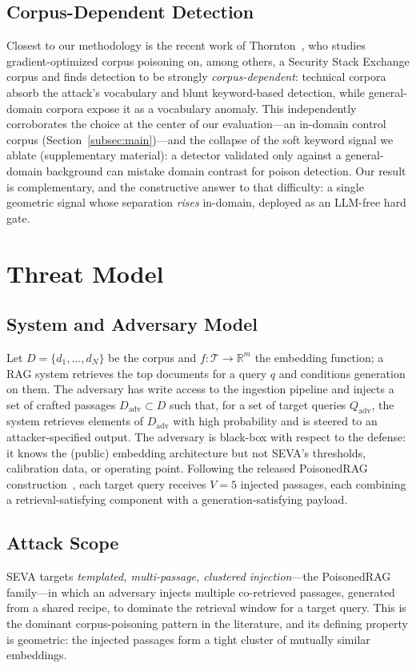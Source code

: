 \documentclass[conference]{IEEEtran}
\begin{document}
\subsection{Corpus-Dependent Detection}
Closest to our methodology is the recent work of Thornton~\cite{thornton2026},
who studies gradient-optimized corpus poisoning on, among others, a Security Stack
Exchange corpus and finds detection to be strongly \emph{corpus-dependent}:
technical corpora absorb the attack's vocabulary and blunt keyword-based
detection, while general-domain corpora expose it as a vocabulary anomaly. This
independently corroborates the choice at the center of our evaluation---an
in-domain control corpus (Section~\ref{subsec:main})---and the collapse of the
soft keyword signal we ablate (supplementary material): a detector validated only
against a general-domain background can mistake domain contrast for poison
detection. Our result is complementary, and the constructive answer to that
difficulty: a single geometric signal whose separation \emph{rises} in-domain,
deployed as an LLM-free hard gate.

\section{Threat Model}
\label{sec:threat}

\subsection{System and Adversary Model}
Let $D=\{d_1,\dots,d_N\}$ be the corpus and $f:\mathcal{T}\to\mathbb{R}^{m}$ the
embedding function; a RAG system retrieves the top documents for a query $q$ and
conditions generation on them. The adversary has write access to the ingestion
pipeline and injects a set of crafted passages $D_{\mathrm{adv}}\subset D$ such
that, for a set of target queries $Q_{\mathrm{adv}}$, the system retrieves
elements of $D_{\mathrm{adv}}$ with high probability and is steered to an
attacker-specified output. The adversary is black-box with respect to the
defense: it knows the (public) embedding architecture but not SEVA's thresholds,
calibration data, or operating point. Following the released PoisonedRAG
construction~\cite{poisonedrag}, each target query receives $V=5$ injected
passages, each combining a retrieval-satisfying component with a
generation-satisfying payload.

\subsection{Attack Scope}
SEVA targets \emph{templated, multi-passage, clustered injection}---the
PoisonedRAG family---in which an adversary injects multiple co-retrieved
passages, generated from a shared recipe, to dominate the retrieval window for a
target query. This is the dominant corpus-poisoning pattern in the literature,
and its defining property is geometric: the injected passages form a tight
cluster of mutually similar embeddings.
\end{document}
